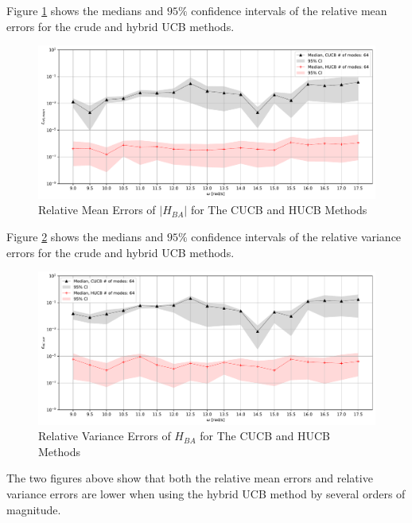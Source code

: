 Figure \ref{e_mean HUCB_B_A} shows the medians and $95\%$ confidence intervals of the relative mean errors for the crude and hybrid UCB methods.
\begin{figure}[H]
    \centering
    \includegraphics[width=1.0\textwidth]{
        plots/substructuring/plot_13.pdf
    }
    \caption{%
        Relative Mean Errors of $\left|H_{BA}\right|$ for The CUCB and HUCB Methods
    }
    \label{e_mean HUCB_B_A}
\end{figure}
Figure \ref{e_var HUCB_B_A} shows the medians and $95\%$ confidence intervals of the relative variance errors for the crude and hybrid UCB methods.
\begin{figure}[H]
    \centering
    \includegraphics[width=1.0\textwidth]{
        plots/substructuring/plot_14.pdf
    }
    \caption{%
        Relative Variance Errors of $H_{BA}$ for The CUCB and HUCB Methods
    }
    \label{e_var HUCB_B_A}
\end{figure}
The two figures above show that both the relative mean errors and relative variance errors are lower when using the hybrid UCB method by several orders of magnitude.